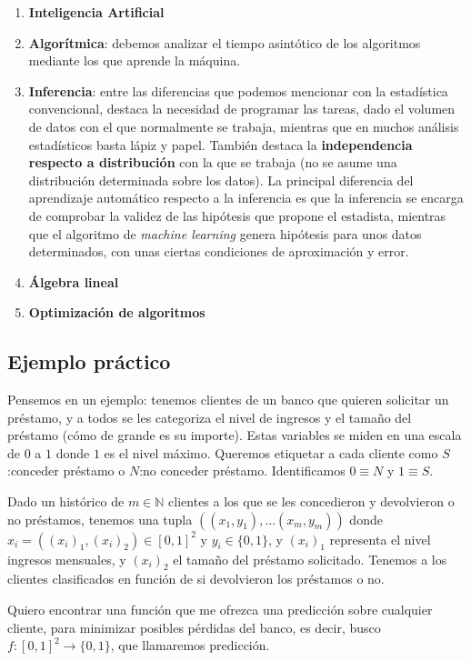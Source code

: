 \begin{enumerate}[i]
 \item \textbf{Inteligencia Artificial}
 \item \textbf{Algorítmica}: debemos analizar el tiempo asintótico de los algoritmos mediante los que aprende la máquina.
 \item \textbf{Inferencia}: entre las diferencias que podemos mencionar con la estadística convencional, destaca la necesidad de 
 programar las tareas, dado el volumen de datos con el que normalmente se trabaja, mientras que en muchos análisis estadísticos basta 
 lápiz y papel. También destaca la \textbf{independencia respecto a distribución} con la que se trabaja (no se asume una distribución
 determinada sobre los datos). La principal diferencia del aprendizaje automático respecto a la inferencia es que la inferencia
 se encarga de comprobar la validez de las hipótesis que propone el estadista, mientras que el algoritmo de 
 \textit{machine learning} genera hipótesis para unos datos determinados, con unas ciertas condiciones de aproximación y error.
 \item \textbf{Álgebra lineal}
 \item \textbf{Optimización de algoritmos}
\end{enumerate}

\subsection{Ejemplo práctico}
Pensemos en un ejemplo: tenemos clientes de un banco que quieren solicitar un préstamo, y a todos se les categoriza
el nivel de ingresos y el tamaño del préstamo (cómo de grande es su importe). Estas variables se miden 
en una escala de $0$ a $1$ donde $1$ es el nivel máximo. Queremos etiquetar a cada cliente como $S$:conceder préstamo o 
$N$:no conceder préstamo. Identificamos $0\equiv N$ y $1\equiv S$.

Dado un histórico de $m\in \mathbb{N}$ clientes a los que se les concedieron y devolvieron o no préstamos, tenemos una tupla 
$((x_1, y_1), \ldots (x_m, y_m))$ donde $x_i = ((x_i)_1, (x_i)_2) \in [0,1]^2$ y $y_i \in \{0,1\}$, y $(x_i)_1$ representa el nivel ingresos mensuales, 
y $(x_i)_2$ el tamaño del préstamo solicitado. Tenemos a los clientes clasificados en función de si devolvieron los 
préstamos o no.

Quiero encontrar una función que me ofrezca una predicción sobre cualquier cliente, para minimizar posibles pérdidas del banco, es
decir, busco $f:[0,1]^2 \rightarrow \{0,1\}$, que llamaremos predicción.

